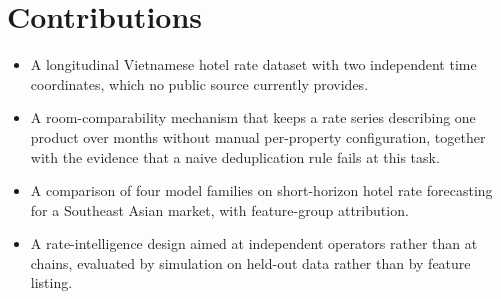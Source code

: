 \section{Contributions}

\begin{itemize}[leftmargin=*]
    \item A longitudinal Vietnamese hotel rate dataset with two independent time coordinates, which no public source currently provides.
    \item A room-comparability mechanism that keeps a rate series describing one product over months without manual per-property configuration, together with the evidence that a naive deduplication rule fails at this task.
    \item A comparison of four model families on short-horizon hotel rate forecasting for a Southeast Asian market, with feature-group attribution.
    \item A rate-intelligence design aimed at independent operators rather than at chains, evaluated by simulation on held-out data rather than by feature listing.
\end{itemize}
